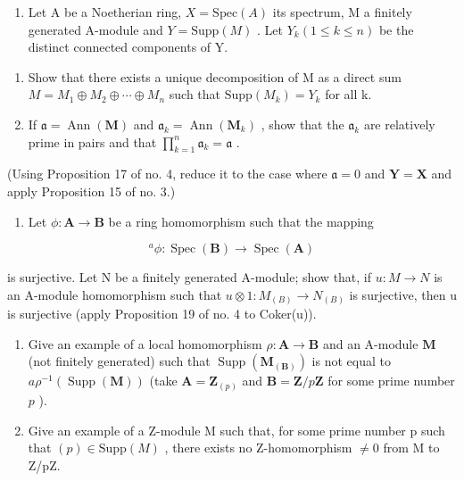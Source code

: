 \begin{enumerate}
\def\labelenumi{\arabic{enumi}.}
\setcounter{enumi}{24}
\tightlist
\item
  Let A be a Noetherian ring, \(X = \text{Spec}(A)\) its spectrum, M a finitely generated A-module and \(Y = \text{Supp}(M)\) . Let \(Y_k (1 \leqslant k \leqslant n)\) be the distinct connected components of Y.
\end{enumerate}

\begin{enumerate}
\def\labelenumi{(\alph{enumi})}
\item
  Show that there exists a unique decomposition of M as a direct sum \(M = M_{1} \oplus M_{2} \oplus \cdots \oplus M_{n}\) such that \(\text{Supp}(M_{k}) = Y_{k}\) for all k.
\item
  If \(\mathfrak{a} = \operatorname{Ann}(\mathbf{M})\) and \(\mathfrak{a}_k = \operatorname{Ann}(\mathbf{M}_k)\) , show that the \(\mathfrak{a}_k\) are relatively prime in pairs and that \(\prod_{k=1}^{n} \mathfrak{a}_k = \mathfrak{a}\) .
\end{enumerate}

(Using Proposition 17 of no. 4, reduce it to the case where \(\mathfrak{a} = 0\) and \(\mathbf{Y} = \mathbf{X}\) and apply Proposition 15 of no. 3.)

\begin{enumerate}
\def\labelenumi{\arabic{enumi}.}
\setcounter{enumi}{25}
\tightlist
\item
  Let \(\phi: \mathbf{A} \to \mathbf{B}\) be a ring homomorphism such that the mapping
\end{enumerate}

\[
^ {a} \phi : \operatorname{Spec} (\mathbf {B}) \rightarrow \operatorname{Spec} (\mathbf {A})
\]

is surjective. Let N be a finitely generated A-module; show that, if \(u: M \to N\) is an A-module homomorphism such that \(u \otimes 1: M_{(B)} \to N_{(B)}\) is surjective, then u is surjective (apply Proposition 19 of no. 4 to Coker(u)).

\begin{enumerate}
\def\labelenumi{\arabic{enumi}.}
\setcounter{enumi}{26}
\item
  Give an example of a local homomorphism \(\rho: \mathbf{A} \to \mathbf{B}\) and an A-module \(\mathbf{M}\) (not finitely generated) such that \(\operatorname{Supp}(\mathbf{M}_{(\mathbf{B})})\) is not equal to \(a\rho^{-1}(\operatorname{Supp}(\mathbf{M}))\) (take \(\mathbf{A} = \mathbf{Z}_{(p)}\) and \(\mathbf{B} = \mathbf{Z}/p\mathbf{Z}\) for some prime number \(p\) ).
\item
  Give an example of a Z-module M such that, for some prime number p such that \((p) \in \text{Supp}(M)\) , there exists no Z-homomorphism \(\neq 0\) from M to Z/pZ.
\end{enumerate}

